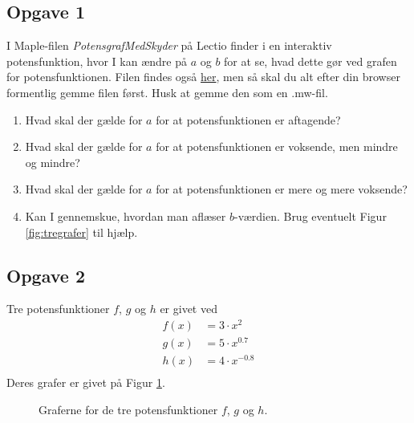 \subsection*{Opgave 1}
I Maple-filen \textit{PotensgrafMedSkyder} på Lectio finder i en interaktiv potensfunktion, hvor I kan ændre på $a$ og $b$ for at se, hvad dette gør ved grafen for potensfunktionen. Filen findes også \href{https://raw.githubusercontent.com/ChristianJLex/TeachingNotes/master/2023-2024/Moduler1m/V%C3%A6kst_diverse/PotensgrafMedSkyder.mw}{\color{blue!60} her}, men så skal du alt efter din browser formentlig gemme filen først. Husk at gemme den som en .mw-fil.
\begin{enumerate}[label=\roman*)]
	\item Hvad skal der gælde for $a$ for at potensfunktionen er aftagende?
	\item Hvad skal der gælde for $a$ for at potensfunktionen er voksende, men mindre og mindre?
	\item Hvad skal der gælde for $a$ for at potensfunktionen er mere og mere voksende?
	\item Kan I gennemskue, hvordan man aflæser $b$-værdien. Brug eventuelt Figur \ref{fig:tregrafer} til hjælp.
\end{enumerate} 

\subsection*{Opgave 2}
Tre potensfunktioner $f$, $g$ og $h$ er givet ved
\begin{align*}
	f(x) &= 3\cdot x ^2\\
	g(x) &= 5\cdot x^{0.7}\\
	h(x) &= 4\cdot x^{-0.8}\\
\end{align*}
Deres grafer er givet på Figur \ref{fig:potensgrafer}.
\begin{figure}[H]
	\centering
	\caption{Graferne for de tre potensfunktioner $f$, $g$ og $h$.}
	\label{fig:potensgrafer}
\end{figure}


